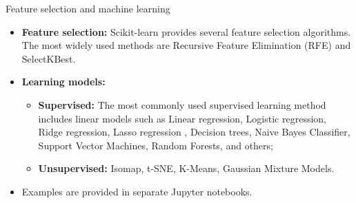 \documentclass{beamer}
\begin{document}
\begin{frame}[fragile]{Feature selection and machine learning}
\begin{itemize}
    \item \textbf{Feature selection:} Scikit-learn provides several feature selection algorithms. The most widely used methods are Recursive Feature Elimination (RFE) and SelectKBest. 
    \item \textbf{Learning models:} 
    \begin{itemize}
\item \textbf{Supervised:} The most commonly used supervised learning method includes linear models such as Linear regression, Logistic regression, Ridge regression, Lasso regression , Decision trees, Naive Bayes Classifier, Support Vector Machines, Random Forests, and others;  
\item \textbf{Unsupervised:} Isomap, t-SNE,  K-Means, Gaussian Mixture Models. 
\end{itemize}
\item Examples are provided in separate Jupyter notebooks.
\end{itemize}
\end{frame}
\end{document}
